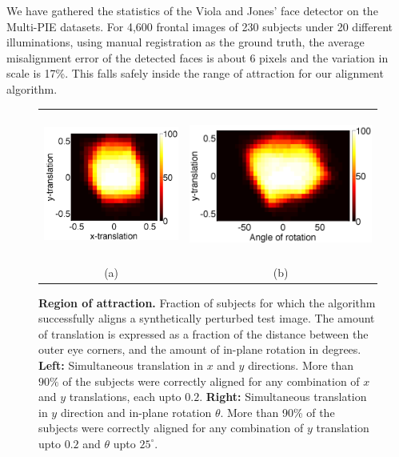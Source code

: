 \begin{enumerate}
We have gathered the statistics of the Viola and Jones' face detector on the Multi-PIE datasets. For 4,600 frontal images of 230 subjects under 20 different illuminations, using manual registration as the ground truth, the average misalignment error of the detected faces is about 6 pixels and the variation in scale is 17\%. This falls safely inside the range of attraction for our alignment algorithm.
\begin{figure}
\centering
\begin{tabular}{cc}
\includegraphics[height=1.8in]{figures_cvpr/translation_fig3.png} &
\includegraphics[height=1.9in]{figures_cvpr/translation_rotation_fig1.png}\\
(a)&(b)
\end{tabular}
\vspace{0mm}
\caption{{\bf Region of attraction.} Fraction of subjects for which the algorithm successfully aligns a synthetically perturbed test image.  The amount of translation is expressed as a fraction of the distance between the outer eye corners, and the amount of in-plane rotation in degrees. {\bf Left:} Simultaneous translation in $x$ and $y$ directions. More than $90\%$ of the subjects were correctly aligned for any combination of $x$ and $y$ translations, each upto $0.2$. {\bf Right:} Simultaneous translation in $y$ direction and in-plane rotation $\theta$. More than 90\% of the subjects were correctly aligned for any combination of $y$ translation upto $0.2$ and $\theta$ upto $25^\circ$.}
\label{fig:attraction}
\end{figure}


\end{enumerate}
